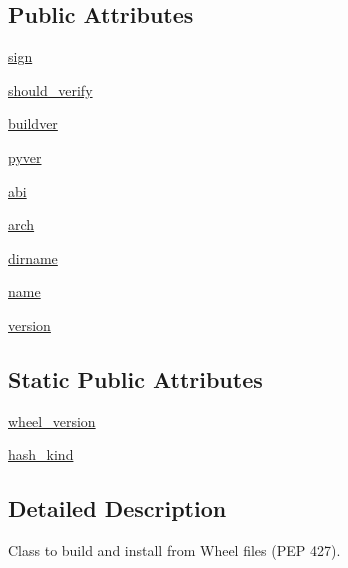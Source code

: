 \subsection*{Public Attributes}
\begin{DoxyCompactItemize}
\item 
\hyperlink{classpip_1_1__vendor_1_1distlib_1_1wheel_1_1Wheel_ad67a8f9a21c79458bbcf626898aadf94}{sign}
\item 
\hyperlink{classpip_1_1__vendor_1_1distlib_1_1wheel_1_1Wheel_a8cedc2c4cbac8acd760ee0b2cc1d3660}{should\+\_\+verify}
\item 
\hyperlink{classpip_1_1__vendor_1_1distlib_1_1wheel_1_1Wheel_aae1ca02956d626239c7f75d0ced72081}{buildver}
\item 
\hyperlink{classpip_1_1__vendor_1_1distlib_1_1wheel_1_1Wheel_aaa7509b7104fd578458ba8c096d7a1b6}{pyver}
\item 
\hyperlink{classpip_1_1__vendor_1_1distlib_1_1wheel_1_1Wheel_a8648b99a8e263c81aa99ee95f52bd596}{abi}
\item 
\hyperlink{classpip_1_1__vendor_1_1distlib_1_1wheel_1_1Wheel_abd7fd726f0663cc70429acc96986f31f}{arch}
\item 
\hyperlink{classpip_1_1__vendor_1_1distlib_1_1wheel_1_1Wheel_aca81d2c31ff57dead44bb0aa1b563bf5}{dirname}
\item 
\hyperlink{classpip_1_1__vendor_1_1distlib_1_1wheel_1_1Wheel_adee42f66f400a8ad1fc5c40bbb54c3c6}{name}
\item 
\hyperlink{classpip_1_1__vendor_1_1distlib_1_1wheel_1_1Wheel_abc6ddadec8384d3d89354bf794cc3139}{version}
\end{DoxyCompactItemize}
\subsection*{Static Public Attributes}
\begin{DoxyCompactItemize}
\item 
\hyperlink{classpip_1_1__vendor_1_1distlib_1_1wheel_1_1Wheel_a827976d873f42ebc8b67dd4f11424daf}{wheel\+\_\+version}
\item 
\hyperlink{classpip_1_1__vendor_1_1distlib_1_1wheel_1_1Wheel_aa316c6c26673783981d184653ca3fba3}{hash\+\_\+kind}
\end{DoxyCompactItemize}


\subsection{Detailed Description}
\begin{DoxyVerb}Class to build and install from Wheel files (PEP 427).
\end{DoxyVerb}
 

